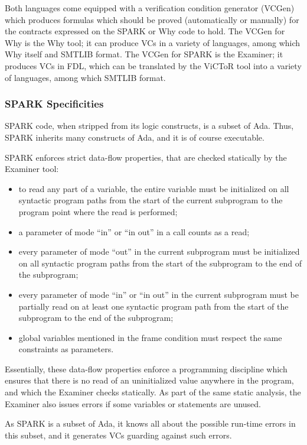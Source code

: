 \documentclass[fullpage]{article}
\begin{document}
Both languages come equipped with a verification condition generator (VCGen)
which produces formulas which should be proved (automatically or manually) for
the contracts expressed on the SPARK or Why code to hold. The VCGen for Why is
the Why tool; it can produce VCs in a variety of languages, among which Why
itself and SMTLIB format.  The VCGen for SPARK is the Examiner; it produces VCs
in FDL, which can be translated by the ViCToR tool into a variety of languages,
among which SMTLIB format.

\subsubsection{SPARK Specificities}

SPARK code, when stripped from its logic constructs, is a subset of
Ada. Thus, SPARK inherits many constructs of Ada, and it is of course
executable.

SPARK enforces strict data-flow properties, that are checked statically by the
Examiner tool:
\begin{itemize}
\item to read any part of a variable, the entire variable must be initialized
  on all syntactic program paths from the start of the current subprogram to
  the program point where the read is performed;
\item a parameter of mode ``in'' or ``in out'' in a call counts as a read;
\item every parameter of mode ``out'' in the current subprogram must be
  initialized on all syntactic program paths from the start of the subprogram
  to the end of the subprogram;
\item every parameter of mode ``in'' or ``in out'' in the current subprogram
  must be partially read on at least one syntactic program path from the start
  of the subprogram to the end of the subprogram;
\item global variables mentioned in the frame condition must respect the same
  constraints as parameters.
\end{itemize}

Essentially, these data-flow properties enforce a programming discipline which
ensures that there is no read of an uninitialized value anywhere in the
program, and which the Examiner checks statically.  As part of the same static
analysis, the Examiner also issues errors if some variables or statements are
unused.

As SPARK is a subset of Ada, it knows all about the possible run-time errors in
this subset, and it generates VCs guarding against such errors.
\end{document}
